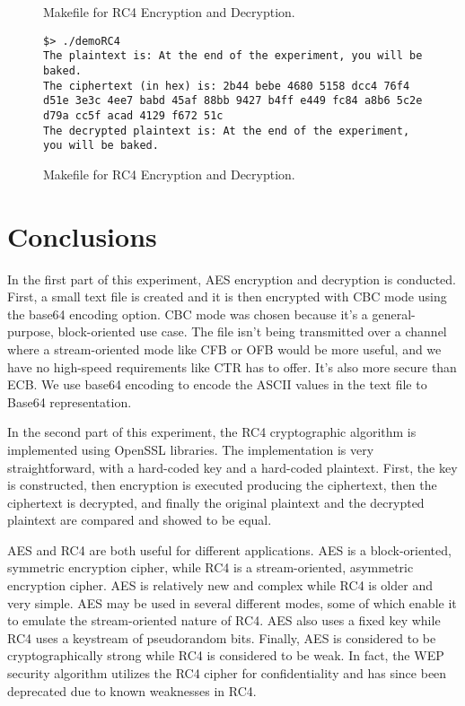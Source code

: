 \documentclass{article}
\begin{document}
\begin{figure}
\begin{mdframed}

\end{mdframed}
\caption{Makefile for RC4 Encryption and Decryption.}
\label{fig:step2bb}
\end{figure}

\begin{figure}
\begin{mdframed}
\begin{lstlisting}
$> ./demoRC4
The plaintext is: At the end of the experiment, you will be baked.
The ciphertext (in hex) is: 2b44 bebe 4680 5158 dcc4 76f4 d51e 3e3c 4ee7 babd 45af 88bb 9427 b4ff e449 fc84 a8b6 5c2e d79a cc5f acad 4129 f672 51c
The decrypted plaintext is: At the end of the experiment, you will be baked.
\end{lstlisting}
\end{mdframed}
\caption{Makefile for RC4 Encryption and Decryption.}
\label{fig:step2bc}
\end{figure}


\section{Conclusions}

In the first part of this experiment, AES encryption and decryption is conducted. First, a small text file is created and it is then
encrypted with CBC mode using the base64 encoding option. CBC mode was chosen because it's a general-purpose, block-oriented use case.
The file isn't being transmitted over a channel where a stream-oriented mode like CFB or OFB would be more useful, and we have no
high-speed requirements like CTR has to offer. It's also more secure than ECB. We use base64 encoding to encode the ASCII values in the
text file to Base64 representation.

In the second part of this experiment, the RC4 cryptographic algorithm is implemented using OpenSSL libraries. The implementation is very
straightforward, with a hard-coded key and a hard-coded plaintext. First, the key is constructed, then encryption is executed producing the
ciphertext, then the ciphertext is decrypted, and finally the original plaintext and the decrypted plaintext are compared and showed to be
equal.

AES and RC4 are both useful for different applications. AES is a block-oriented, symmetric encryption cipher, while RC4 is a
stream-oriented, asymmetric encryption cipher. AES is relatively new and complex while RC4 is older and very simple. AES may be used in
several different modes, some of which enable it to emulate the stream-oriented nature of RC4. AES also uses a fixed key while RC4 uses a
keystream of pseudorandom bits. Finally, AES is considered to be cryptographically strong while RC4 is considered to be weak. In fact, the
WEP security algorithm utilizes the RC4 cipher for confidentiality and has since been deprecated due to known weaknesses in RC4.
\end{document}
